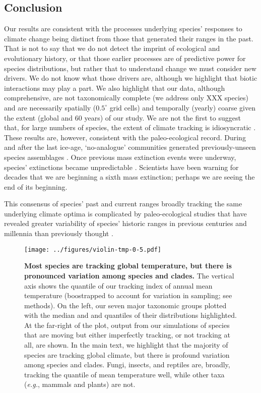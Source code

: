 \documentclass[12pt]{report}
\begin{document}
\subsection*{Conclusion}
Our results are consistent with the processes underlying species'
responses to climate change being distinct from those that generated
their ranges in the past. That is not to say that we do not detect the
imprint of ecological and evolutionary history, or that those earlier
processes are of predictive power for species distributions, but
rather that to understand change we must consider new drivers. We do
not know what those drivers are, although we highlight that biotic
interactions may play a part. We also highlight that our data,
although comprehensive, are not taxonomically complete (we address
only XXX species) and are necessarily spatially ($0.5^\circ$ grid
cells) and temporally (yearly) coarse given the extent (global and 60
years) of our study. We are not the first to suggest that, for large
numbers of species, the extent of climate tracking is idiosyncratic
\supercite{xxx}. These results are, however, consistent with the
paleo-ecological record. During and after the last ice-age,
`no-analogue' communities generated previously-unseen species
assemblages \supercite{xxx}. Once previous mass extinction events were
underway, species' extinctions became unpredictable
\supercite{xxx}. Scientists have been warning for decades that we are
beginning a sixth mass extinction;
perhaps we are seeing the end of its beginning.

This consensus of species' past and current ranges broadly tracking
the same underlying climate optima is complicated by paleo-ecological
studies that have revealed greater variability of species' historic
ranges in previous centuries and millennia than previously thought
\supercite{Williams2007,Veloz2012,Maguire2015}.

\clearpage
\clearpage
\begin{figure}[h!]
  \begin{center}
    \texttt{[image: ../figures/violin-tmp-0-5.pdf]}
  \end{center}
  \caption{\doublespacing \textbf{Most species are tracking global
      temperature, but there is pronounced variation among species and
      clades.} The vertical axis shows the  quantile of our
    tracking index of annual mean temperature (boostrapped to account
    for variation in sampling; see methods). On the left, our seven
    major taxonomic groups plotted with the median and  and
     quantiles of their distributions highlighted. At the
    far-right of the plot, output from our simulations of species that
    are moving but either imperfectly tracking, or not tracking at
    all, are shown. In the main text, we highlight that the majority
    of species are tracking global climate, but there is profound
    variation among species and clades. Fungi, insects, and reptiles
    are, broadly, tracking the  quantile of mean temperature
    well, while other taxa (\emph{e.g.}, mammals and plants) are not.}
  \label{violin}
\end{figure}
\end{document}
